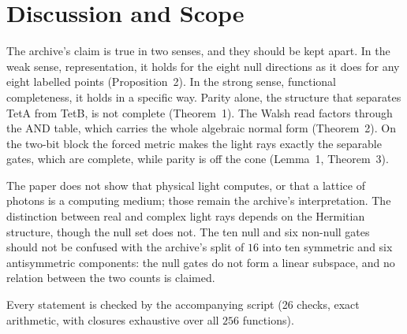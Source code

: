 \documentclass[twocolumn]{iopjournal}
\begin{document}

\section{Discussion and Scope}

The archive's claim is true in two senses, and they should be kept
apart. In the weak sense, representation, it holds for the eight null
directions as it does for any eight labelled points (Proposition~2). In
the strong sense, functional completeness, it holds in a specific way.
Parity alone, the structure that separates TetA from TetB, is not
complete (Theorem~1). The Walsh read factors through the AND table,
which carries the whole algebraic normal form (Theorem~2). On the
two-bit block the forced metric makes the light rays exactly the
separable gates, which are complete, while parity is off the cone
(Lemma~1, Theorem~3).

The paper does not show that physical light computes, or that a
lattice of photons is a computing medium; those remain the archive's
interpretation. The distinction between real and complex light rays
depends on the Hermitian structure, though the null set does not. The
ten null and six non-null gates should not be confused with the
archive's split of $16$ into ten symmetric and six antisymmetric
components: the null gates do not form a linear subspace, and no
relation between the two counts is claimed.

Every statement is checked by the accompanying script (26 checks,
exact arithmetic, with closures exhaustive over all $256$ functions).

\end{document}
